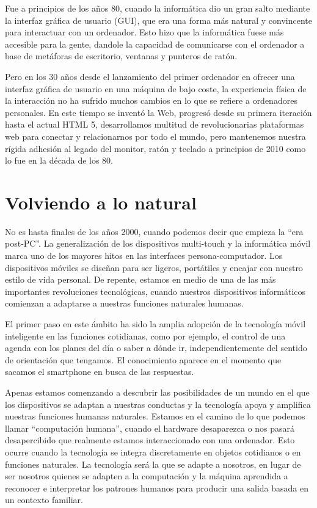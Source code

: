 Fue a principios de los años 80, cuando la informática dio un gran salto mediante la interfaz gráfica de usuario (GUI), que era una forma más natural y convincente para interactuar con un ordenador. Esto hizo que la informática fuese más accesible para la gente, dandole la capacidad de comunicarse con el ordenador a base de metáforas de escritorio, ventanas y punteros de ratón.

Pero en los 30 años desde el lanzamiento del primer ordenador en ofrecer una interfaz gráfica de usuario en una máquina de bajo coste, la experiencia física de la interacción no ha sufrido muchos cambios en lo que se refiere a ordenadores personales. En este tiempo se inventó la Web, progresó desde su primera iteración hasta el actual HTML 5, desarrollamos multitud de revolucionarias plataformas web para conectar y relacionarnos por todo el mundo, pero mantenemos nuestra rígida adhesión al legado del monitor, ratón y teclado a principios de 2010 como lo fue en la década de los 80. 

\section{Volviendo a lo natural}
No es hasta finales de los años 2000, cuando podemos decir que empieza la ``era post-PC''. La generalización de los dispositivos multi-touch y la informática móvil marca uno de los mayores hitos en las interfaces persona-computador. Los dispositivos móviles se diseñan para ser ligeros, portátiles y encajar con nuestro estilo de vida personal. De repente, estamos en medio de una de las más importantes revoluciones tecnológicas, cuando nuestros dispositivos informáticos comienzan a adaptarse a nuestras funciones naturales humanas.

El primer paso en este ámbito ha sido la amplia adopción de la tecnología móvil inteligente en las funciones cotidianas, como por ejemplo, el control de una agenda con los planes del día o saber a dónde ir, independientemente del sentido de orientación que tengamos. El conocimiento aparece en el momento que sacamos el smartphone en busca de las respuestas.

Apenas estamos comenzando a descubrir las posibilidades de un mundo en el que los dispositivos se adaptan a nuestras conductas y la tecnología apoya y amplifica nuestras funciones humanas naturales. Estamos en el camino de lo que podemos llamar ``computación humana'', cuando el hardware desaparezca o nos pasará desapercibido que realmente estamos interaccionado con una ordenador. Esto ocurre cuando la tecnología se integra discretamente en objetos cotidianos o en funciones naturales. La tecnología será la que se adapte a nosotros, en lugar de ser nosotros quienes se adapten a la computación y la máquina aprendida a reconocer e interpretar los patrones humanos para producir una salida basada en un contexto familiar.

